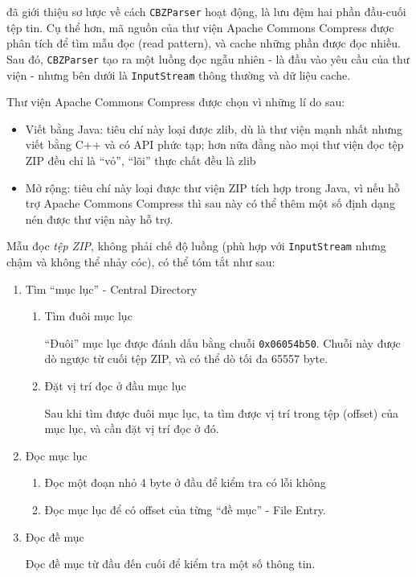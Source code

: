 \documentclass[../../thesis]{subfiles}
\begin{document}
 đã giới thiệu sơ lược về cách \texttt{CBZParser} hoạt
động, là lưu đệm hai phần đầu-cuối tệp tin. Cụ thể hơn, mã nguồn của thư viện
Apache Commons Compress được phân tích để tìm mẫu đọc (read pattern), và cache
những phần được đọc nhiều. Sau đó, \texttt{CBZParser} tạo ra một luồng đọc ngẫu
nhiên - là đầu vào yêu cầu của thư viện - nhưng bên dưới là \texttt{InputStream}
thông thường và dữ liệu cache.

Thư viện Apache Commons Compress được chọn vì những lí do sau:

\begin{itemize}
    \item
        Viết bằng Java: tiêu chí này loại được zlib, dù là thư viện mạnh nhất
        nhưng viết bằng C++ và có API phức tạp; hơn nữa đằng nào mọi thư viện
        đọc tệp ZIP đều chỉ là ``vỏ'', ``lõi'' thực chất đều là zlib
    \item
        Mở rộng: tiêu chí này loại được thư viện ZIP tích hợp trong Java, vì nếu
        hỗ trợ Apache Commons Compress thì sau này có thể thêm một số định dạng
        nén được thư viện này hỗ trợ.
\end{itemize}

Mẫu đọc \emph{tệp ZIP}, không phải chế độ luồng (phù hợp với
\texttt{InputStream} nhưng chậm và không thể nhảy cóc), có thể tóm tắt như sau:

\begin{enumerate}
    \item
        Tìm ``mục lục'' - Central Directory

        \begin{enumerate}
            \item
                Tìm đuôi mục lục

                ``Đuôi'' mục lục được đánh dấu bằng chuỗi \texttt{0x06054b50}.
                Chuỗi này được dò ngược từ cuối tệp ZIP, và có thể dò tối đa
                65557 byte.
            \item
                Đặt vị trí đọc ở đầu mục lục

                Sau khi tìm được đuôi mục lục, ta tìm được vị trí trong tệp
                (offset) của mục lục, và cần đặt vị trí đọc ở đó.
        \end{enumerate}
    \item
        Đọc mục lục

        \begin{enumerate}
            \item
                Đọc một đoạn nhỏ 4 byte ở đầu để kiểm tra có lỗi không
            \item
                Đọc mục lục để có offset của từng ``đề mục'' - File Entry.
        \end{enumerate}
    \item
        Đọc đề mục

        Đọc đề mục từ đầu đến cuối để kiểm tra một số thông tin.
\end{enumerate}
\end{document}
